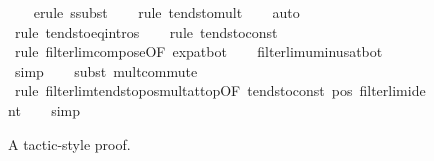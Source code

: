 \documentclass[leqno]{article}
\theoremstyle{definition}
\begin{document}
\begin{figure}
\begin{isabellebody}
\ \ \isamarkupfalse%
\ {\isacharparenleft}erule\ ssubst{\isacharparenright}\isanewline
\ \ \isamarkupfalse%
\ {\isacharparenleft}rule\ tendsto{\isacharunderscore}mult{\isacharparenright}{\isacharplus}\isanewline
\ \ \isamarkupfalse%
\ auto\isanewline
\ \ \isamarkupfalse%
\ {\isacharparenleft}rule\ tendsto{\isacharunderscore}eq{\isacharunderscore}intros{\isacharparenright}\isanewline
\ \ \isamarkupfalse%
\ {\isacharparenleft}rule\ tendsto{\isacharunderscore}const{\isacharparenright}\isanewline
\ \ \isamarkupfalse%
\ {\isacharparenleft}rule\ filterlim{\isacharunderscore}compose{\isacharbrackleft}OF\ exp{\isacharunderscore}at{\isacharunderscore}bot{\isacharbrackright}{\isacharparenright}\isanewline
\ \ \isamarkupfalse%
\ filterlim{\isacharunderscore}uminus{\isacharunderscore}at{\isacharunderscore}bot\isanewline
\ \ \isamarkupfalse%
\ simp\isanewline
\ \ \isamarkupfalse%
\ {\isacharparenleft}subst\ mult{\isachardot}commute{\isacharparenright}\isanewline
\ \ \isamarkupfalse%
\ {\isacharparenleft}rule\ filterlim{\isacharunderscore}tendsto{\isacharunderscore}pos{\isacharunderscore}mult{\isacharunderscore}at{\isacharunderscore}top{\isacharbrackleft}OF\ tendsto{\isacharunderscore}const\ pos\ filterlim{\isacharunderscore}ident{\isacharbrackright}{\isacharparenright}\isanewline
\ \ \isamarkupfalse%
\ simp\isanewline
\ \ \isamarkupfalse%
\end{isabellebody}
\caption{A tactic-style proof.}
\label{fig:tact}
\end{figure}
\end{document}
